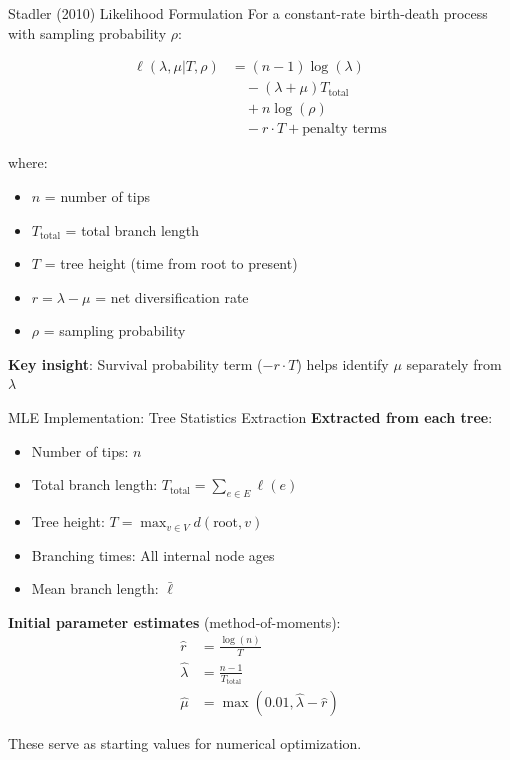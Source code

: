 \documentclass{beamer}
\begin{document}
\begin{frame}{Stadler (2010) Likelihood Formulation}
    For a constant-rate birth-death process with sampling probability $\rho$:
    
    \begin{align*}
        \ell(\lambda, \mu | T, \rho) &= (n-1) \log(\lambda) \\
        &\quad - (\lambda + \mu) T_{\text{total}} \\
        &\quad + n \log(\rho) \\
        &\quad - r \cdot T + \text{penalty terms}
    \end{align*}
    
    where:
    \begin{itemize}
        \item $n$ = number of tips
        \item $T_{\text{total}}$ = total branch length
        \item $T$ = tree height (time from root to present)
        \item $r = \lambda - \mu$ = net diversification rate
        \item $\rho$ = sampling probability
    \end{itemize}
    
    \vspace{0.2cm}
    \textbf{Key insight}: Survival probability term ($-r \cdot T$) helps identify $\mu$ separately from $\lambda$
\end{frame}

\begin{frame}{MLE Implementation: Tree Statistics Extraction}
    \textbf{Extracted from each tree}:
    \begin{itemize}
        \item Number of tips: $n$
        \item Total branch length: $T_{\text{total}} = \sum_{e \in E} \ell(e)$
        \item Tree height: $T = \max_{v \in V} d(\text{root}, v)$
        \item Branching times: All internal node ages
        \item Mean branch length: $\bar{\ell}$
    \end{itemize}
    
    \vspace{0.3cm}
    \textbf{Initial parameter estimates} (method-of-moments):
    \begin{align*}
        \hat{r} &= \frac{\log(n)}{T} \\
        \hat{\lambda} &= \frac{n-1}{T_{\text{total}}} \\
        \hat{\mu} &= \max(0.01, \hat{\lambda} - \hat{r})
    \end{align*}
    
    These serve as starting values for numerical optimization.
\end{frame}
\end{document}
